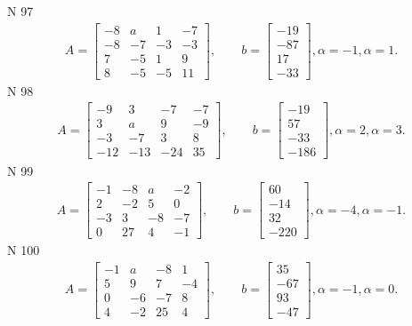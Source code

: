 \documentclass[11pt]{report}
\begin{document}
N 97
\begin{align*}
 A = \left[\begin{matrix}-8 & a & 1 & -7\\-8 & -7 & -3 & -3\\7 & -5 & 1 & 9\\8 & -5 & -5 & 11\end{matrix}\right],
    \qquad b = \left[\begin{matrix}-19\\-87\\17\\-33\end{matrix}\right], \alpha = -1, \alpha = 1. 
 \end{align*}
N 98
\begin{align*}
 A = \left[\begin{matrix}-9 & 3 & -7 & -7\\3 & a & 9 & -9\\-3 & -7 & 3 & 8\\-12 & -13 & -24 & 35\end{matrix}\right],
    \qquad b = \left[\begin{matrix}-19\\57\\-33\\-186\end{matrix}\right], \alpha = 2, \alpha = 3. 
 \end{align*}
N 99
\begin{align*}
 A = \left[\begin{matrix}-1 & -8 & a & -2\\2 & -2 & 5 & 0\\-3 & 3 & -8 & -7\\0 & 27 & 4 & -1\end{matrix}\right],
    \qquad b = \left[\begin{matrix}60\\-14\\32\\-220\end{matrix}\right], \alpha = -4, \alpha = -1. 
 \end{align*}
N 100
\begin{align*}
 A = \left[\begin{matrix}-1 & a & -8 & 1\\5 & 9 & 7 & -4\\0 & -6 & -7 & 8\\4 & -2 & 25 & 4\end{matrix}\right],
    \qquad b = \left[\begin{matrix}35\\-67\\93\\-47\end{matrix}\right], \alpha = -1, \alpha = 0. 
 \end{align*}
\end{document}
